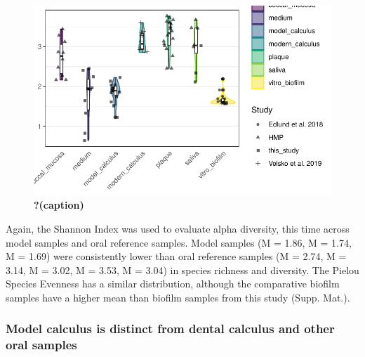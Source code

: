\documentclass[
]{article}
\begin{document}
\begin{figure}

{\centering \includegraphics{figures/fig-shannon-compar-1.pdf}

}

\caption{\label{fig-shannon-compar}\textbf{?(caption)}}

\end{figure}

Again, the Shannon Index was used to evaluate alpha diversity, this time
across model samples and oral reference samples. Model samples (M =
1.86, M = 1.74, M = 1.69) were consistently lower than oral reference
samples (M = 2.74, M = 3.14, M = 3.02, M = 3.53, M = 3.04) in species
richness and diversity. The Pielou Species Evenness has a similar
distribution, although the comparative biofilm samples have a higher
mean than biofilm samples from this study (Supp. Mat.).

\hypertarget{model-calculus-is-distinct-from-dental-calculus-and-other-oral-samples}{%
\subsubsection{Model calculus is distinct from dental calculus and other
oral
samples}\label{model-calculus-is-distinct-from-dental-calculus-and-other-oral-samples}}
\end{document}

